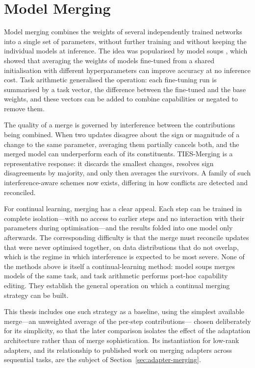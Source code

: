 \section{Model Merging}
\label{sec:model-merging}

Model merging combines the weights of several independently trained
networks into a single set of parameters, without further training and
without keeping the individual models at inference. The idea was
popularised by model soups \parencite{wortsman2022model}, which showed that
averaging the weights of models fine-tuned from a shared initialisation
with different hyperparameters can improve accuracy at no inference cost.
Task arithmetic \parencite{ilharco2023editing} generalised the operation: each
fine-tuning run is summarised by a task vector, the difference between the
fine-tuned and the base weights, and these vectors can be added to combine
capabilities or negated to remove them.

The quality of a merge is governed by interference between the
contributions being combined. When two updates disagree about the sign or
magnitude of a change to the same parameter, averaging them partially
cancels both, and the merged model can underperform each of its
constituents. TIES-Merging \parencite{yadav2023ties} is a representative
response: it discards the smallest changes, resolves sign disagreements by
majority, and only then averages the survivors. A family of such
interference-aware schemes now exists, differing in how conflicts are
detected and reconciled.

For continual learning, merging has a clear appeal. Each step can be
trained in complete isolation---with no access to earlier steps and no
interaction with their parameters during optimisation---and the results
folded into one model only afterwards. The corresponding difficulty is that
the merge must reconcile updates that were never optimised together, on
data distributions that do not overlap, which is the regime in which
interference is expected to be most severe. None of the methods above is
itself a continual-learning method: model soups merges models of the same
task, and task arithmetic performs post-hoc capability editing. They
establish the general operation on which a continual merging strategy can
be built.

This thesis includes one such strategy as a baseline, using the simplest
available merge---an unweighted average of the per-step contributions---%
chosen deliberately for its simplicity, so that the later comparison
isolates the effect of the adaptation architecture rather than of merge
sophistication. Its instantiation for low-rank adapters, and its
relationship to published work on merging adapters across sequential tasks,
are the subject of Section~\ref{sec:adapter-merging}.

